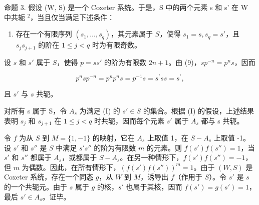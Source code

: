 命题 3. 假设 (W, S) 是一个 Coxeter 系统。于是，S 中的两个元素 s 和 s' 在 W 中共轭 \(^{2}\)，当且仅当满足下述条件：

\begin{enumerate}
\def\labelenumi{(\Roman{enumi})}
\tightlist
\item
  存在一个有限序列 \((s_1, \ldots, s_q)\)，其元素属于 \(S\)，使得 \(s_1 = s, s_q = s'\)，且 \(s_j s_{j+1}\) 的阶在 \(1 \leqslant j < q\) 时为有限奇数。
\end{enumerate}

设 \(s\) 和 \(s'\) 属于 \(S\)，使得 \(p = ss'\) 的阶为有限数 \(2n + 1\)。由 (9)，\(sp^{-n} = p^n s\)，因而

\[
p ^ {n} s p ^ {- n} = p ^ {n} p ^ {n} s = p ^ {- 1} s = s ^ {\prime} s s = s ^ {\prime},\tag{10}
\]

且 \(s'\) 与 \(s\) 共轭。

对所有 s 属于 S，令 \(A_{s}\) 为满足 (I) 的 \(s' \in S\) 的集合。根据 (I) 的假设，上述结果表明 \(s_{j}\) 和 \(s_{j+1}\) 在 \(1 \leqslant j < q\) 时共轭，因而每个元素 \(s'\) 属于 \(A_{s}\) 都与 s 共轭。

令 \(f\) 为从 \(S\) 到 \(M = \{1, -1\}\) 的映射，它在 \(A_s\) 上取值 1，在 \(S - A_s\) 上取值 -1。设 \(s'\) 和 \(s''\) 是 \(S\) 中满足 \(s's''\) 的阶为有限数 \(m\) 的元素。则 \(f(s')f(s'') = 1\)，当 \(s'\) 和 \(s''\) 都属于 \(A_s\)，或都属于 \(S - A_s\)。在另一种情形下，\(f(s')f(s'') = -1\)，但 \(m\) 为偶数。因此，在所有情形下，\((f(s')f(s''))^m = 1\)。由于 \((W, S)\) 是 Coxeter 系统，存在一个同态 \(g\)，从 \(W\) 到 \(M\)，诱导出 \(f\)（作用于 \(S\)）。令 \(s'\) 是 \(s\) 的一个共轭元。由于 \(s\) 属于 \(g\) 的核，\(s'\) 也属于其核，因而 \(f(s') = g(s') = 1\)，最后 \(s' \in A_s\)。证毕。

